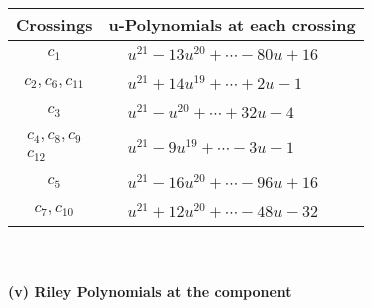 \documentclass[1p]{elsarticle_modified}
\theoremstyle{definition}
\begin{document}
\begin{tabular}{m{50pt}|m{274pt}}
Crossings & \hspace{64pt}u-Polynomials at each crossing \\
\hline $$\begin{aligned}c_{1}\end{aligned}$$&$\begin{aligned}
&u^{21}-13 u^{20}+\cdots-80 u+16
\end{aligned}$\\
\hline $$\begin{aligned}c_{2},c_{6},c_{11}\end{aligned}$$&$\begin{aligned}
&u^{21}+14 u^{19}+\cdots+2 u-1
\end{aligned}$\\
\hline $$\begin{aligned}c_{3}\end{aligned}$$&$\begin{aligned}
&u^{21}- u^{20}+\cdots+32 u-4
\end{aligned}$\\
\hline $$\begin{aligned}c_{4},c_{8},c_{9}\\c_{12}\end{aligned}$$&$\begin{aligned}
&u^{21}-9 u^{19}+\cdots-3 u-1
\end{aligned}$\\
\hline $$\begin{aligned}c_{5}\end{aligned}$$&$\begin{aligned}
&u^{21}-16 u^{20}+\cdots-96 u+16
\end{aligned}$\\
\hline $$\begin{aligned}c_{7},c_{10}\end{aligned}$$&$\begin{aligned}
&u^{21}+12 u^{20}+\cdots-48 u-32
\end{aligned}$\\
\hline
\end{tabular}\\~\\
\newpage\renewcommand{\arraystretch}{1}
\flushleft \textbf{(v) Riley Polynomials at the component}\newline \\
\end{document}
